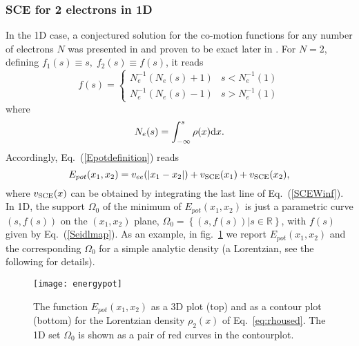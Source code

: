 \documentclass[aps,pra,twocolumn,superscriptaddress]{revtex4}
\begin{document}
\subsubsection{SCE for 2 electrons in 1D}
In the 1D case, a conjectured solution for the co-motion functions for any number of electrons $N$ was presented in \citep{Sei-PRA-99} and proven to be exact later in \citep{ColDepDiM-CJM-14}. For $N=2$, defining $f_1(s)\equiv s,\; f_2(s)\equiv f(s)$, it reads
\begin{equation}\label{Seidlmap}
f(s)=
\begin{cases}
N_e^{-1}\left(N_e(s)+1\right)&s<N_e^{-1}(1)\\
   N_e^{-1}\left(N_e(s)-1\right)&s>N_e^{-1}(1)
   \end{cases}
\end{equation} where 
\begin{equation}\label{cumulant}
N_e(s)=\int_{-\infty}^s\rho(x)\text{\rm{d}}x.
\end{equation}
Accordingly, Eq.~(\ref{Epotdefinition}) reads 
\begin{equation}
E_{pot}(x_1,x_2)=v_{ee}(\vert x_1-x_2\vert)+v_{\text{\rm{SCE}}}(x_1)+v_{\text{\rm{SCE}}}(x_2),
\end{equation}
where $v_{\rm SCE}(x)$ can be obtained by integrating the last line of Eq.~(\ref{SCEWinf}).
In 1D, the support $\Omega_0$ of the minimum  of $E_{pot}(x_1,x_2)$ is just a parametric curve $\left(s,f\left(s\right)\right)$ on the $\left(x_1,x_2\right)$ plane, $\Omega_0=\left\lbrace(s,f(s))\vert s\in\mathbb{R}\right\rbrace$, with $f(s)$ given by Eq.~(\ref{Seidlmap}). As an example, in fig.~\ref{epot} we report $E_{pot}(x_1,x_2)$ and the corresponding  $\Omega_0$ for a simple analytic density (a Lorentzian, see the following for details).
\begin{figure}%
\texttt{[image: energypot]}
\caption{\label{epot} The function $E_{pot}(x_1,x_2)$ as a 3D plot (top) and as a contour plot (bottom) for the Lorentzian density $\rho_2(x)$ of Eq.~\eqref{eq:rhoused}. The 1D set $\Omega_0$ is shown as a pair of red curves in the contourplot.}
\end{figure}
\end{document}
